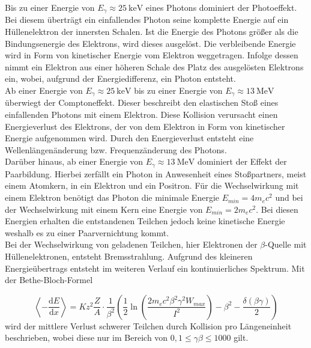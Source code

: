 Bis zu einer Energie von $E_\gamma \approx \SI{25}{\kilo\electronvolt}$ \cite{blub} eines Photons dominiert der Photoeffekt. Bei diesem überträgt ein einfallendes Photon seine komplette Energie auf ein Hüllenelektron der innersten Schalen. Ist die Energie des Photons größer als die Bindungsenergie des Elektrons, wird dieses ausgelöst. Die verbleibende Energie wird in Form von kinetischer Energie vom Elektron weggetragen. Infolge dessen nimmt ein Elektron aus einer höheren Schale des Platz des ausgelösten Elektrons ein, wobei, aufgrund der Energiedifferenz, ein Photon entsteht.\\

Ab einer Energie von $E_\gamma \approx \SI{25}{\kilo\electronvolt}$ \cite{blub} bis zu einer Energie von $E_\gamma \approx \SI{13}{\mega\electronvolt}$ \cite{blub} überwiegt der Comptoneffekt. Dieser beschreibt den elastischen Stoß eines einfallenden Photons mit einem Elektron. Diese Kollision verursacht einen Energieverlust des Elektrons, der von dem Elektron in Form von kinetischer Energie aufgenommen wird. Durch den Energieverlust entsteht eine Wellenlängenänderung bzw. Frequenzänderung des Photons.\\

Darüber hinaus, ab einer Energie von $E_\gamma \approx \SI{13}{\mega\electronvolt}$ \cite{blub} dominiert der Effekt der Paarbildung. Hierbei zerfällt ein Photon in Anwesenheit eines Stoßpartners, meist einem Atomkern, in ein Elektron und ein Positron. Für die Wechselwirkung mit einem Elektron benötigt das Photon die minimale Energie $E_{min}=4m_ec^2$ und bei der Wechselwirkung mit einem Kern eine Energie von $E_{min}=2m_ec^2$. Bei diesen Energien erhalten die entstandenen Teilchen jedoch keine kinetische Energie weshalb es zu einer Paarvernichtung kommt. \\

Bei der Wechselwirkung von geladenen Teilchen, hier Elektronen der $\beta$-Quelle mit Hüllenelektronen, entsteht Bremsstrahlung. Aufgrund des kleineren Energieübertrags entsteht im weiteren Verlauf ein kontinuierliches Spektrum. Mit der Bethe-Bloch-Formel  

\begin{equation}
    \label{Bloch}
    \left< -\frac{\text{d}E}{\text{d}x}\right>=Kz^2\frac{Z}{A}\cdot \frac{1}{\beta^2}\left(\frac{1}{2}\ln{\left(\frac{2m_ec^2\beta^2\gamma^2W_{max}}{I^2}\right)}-\beta^2-\frac{\delta(\beta\gamma)}{2}\right)
\end{equation}
wird der mittlere Verlust schwerer Teilchen durch Kollision pro Längeneinheit beschrieben, wobei diese nur im Bereich von $0,1 \leq \gamma\beta \leq 1000$ gilt.

